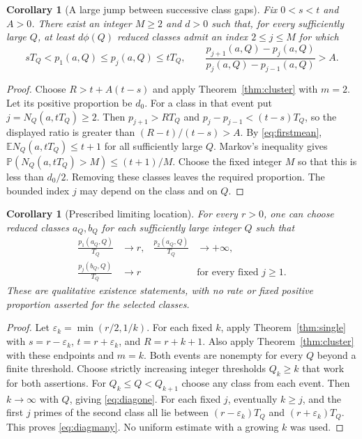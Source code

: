 \documentclass[11pt]{article}
\newtheorem{corollary}[theorem]{Corollary}
\theoremstyle{remark}
\numberwithin{equation}{section}
\newcommand{\E}{\mathbb E}
\newcommand{\PP}{\mathbb P}
\begin{document}
\begin{corollary}[A large jump between successive class gaps]
\label{cor:gapjump}
Fix $0<s<t$ and $A>0$.
There exist an integer $M\ge2$ and $d>0$ such that, for
every sufficiently large $Q$, at least $d\phi(Q)$ reduced
classes admit an index $2\le j\le M$ for which
\[
 sT_Q<p_1(a,Q)\le p_j(a,Q)\le tT_Q,\qquad
 \frac{p_{j+1}(a,Q)-p_j(a,Q)}
      {p_j(a,Q)-p_{j-1}(a,Q)}>A .
\]
\end{corollary}
\begin{proof}
Choose $R>t+A(t-s)$ and apply Theorem~\ref{thm:cluster}
with $m=2$. Let its positive proportion be $d_0$.
For a class in that event put $j=N_Q(a,tT_Q)\ge2$.
Then $p_{j+1}>RT_Q$ and
$p_j-p_{j-1}<(t-s)T_Q$, so the displayed ratio is
greater than $(R-t)/(t-s)>A$.
By \eqref{eq:firstmean},
$\E N_Q(a,tT_Q)\le t+1$ for all sufficiently large $Q$.
Markov's inequality gives
$\PP(N_Q(a,tT_Q)>M)\le(t+1)/M$.
Choose the fixed integer $M$ so that this is less than $d_0/2$.
Removing these classes leaves the required proportion.
The bounded index $j$ may depend on the class and on $Q$.
\end{proof}

\begin{corollary}[Prescribed limiting location]\label{cor:diagonal}
For every $r>0$, one can choose reduced classes $a_Q,b_Q$
for each sufficiently large integer $Q$ such that
\begin{align}
 \frac{p_1(a_Q,Q)}{T_Q}&\longrightarrow r,&
 \frac{p_2(a_Q,Q)}{T_Q}&\longrightarrow+\infty,\label{eq:diagone}\\
 \frac{p_j(b_Q,Q)}{T_Q}&\longrightarrow r
       &&\text{for every fixed }j\ge1.\label{eq:diagmany}
\end{align}
These are qualitative existence statements, with no rate
or fixed positive proportion asserted for the selected classes.
\end{corollary}
\begin{proof}
Let $\varepsilon_k=\min(r/2,1/k)$.
For each fixed $k$, apply Theorem~\ref{thm:single} with
$s=r-\varepsilon_k$, $t=r+\varepsilon_k$, and
$R=r+k+1$.
Also apply Theorem~\ref{thm:cluster} with these endpoints
and $m=k$.
Both events are nonempty for every $Q$ beyond a finite
threshold. Choose strictly increasing integer thresholds $Q_k\ge k$ that
work for both assertions.
For $Q_k\le Q<Q_{k+1}$ choose any class from each event.
Then $k\to\infty$ with $Q$, giving \eqref{eq:diagone}.
For each fixed $j$, eventually $k\ge j$, and the first
$j$ primes of the second class all lie between
$(r-\varepsilon_k)T_Q$ and $(r+\varepsilon_k)T_Q$.
This proves \eqref{eq:diagmany}.
No uniform estimate with a growing $k$ was used.
\end{proof}
\end{document}
